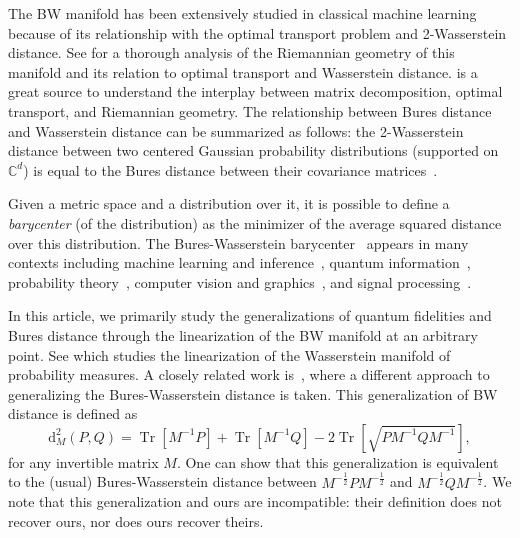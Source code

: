 \documentclass[12pt]{article}
\theoremstyle{definition}
\begin{document}
The BW manifold has been extensively studied in classical machine learning because of its relationship with the optimal transport problem and 2-Wasserstein distance. See \cite{bhatia2019bures} for a thorough analysis of the Riemannian geometry of this manifold and its relation to optimal transport and Wasserstein distance. \cite{modin2016geometry} is a great source to understand the interplay between matrix decomposition, optimal transport, and Riemannian geometry. The relationship between Bures distance and Wasserstein distance can be summarized as follows: the 2-Wasserstein distance between two centered Gaussian probability distributions (supported on $\mathbb C^d$) is equal to the Bures distance between their covariance matrices~\cite{bhatia2019bures}.

Given a metric space and a distribution over it, it is possible to define a \textit{barycenter} (of the distribution) as the minimizer of the average squared distance over this distribution. The Bures-Wasserstein barycenter~\cite{agueh2011barycenters, alvarez2016fixed, bhatia2019bures, chewi2020gradient} appears in many contexts including machine 
learning and inference~\cite{cuturi2014fast, ho2017multilevel, dognin2019wasserstein}, quantum information~\cite{afham2022, brahmachari2023fixed, konig2009operational, Wilde2023estimating}, probability theory~\cite{knott1994generalization, ruschendorf2002n}, computer vision and graphics~\cite{rabin2012wasserstein, solomon2015convolutional}, and signal processing~\cite{elvander2020multi}.



In this article, we primarily study the generalizations of quantum fidelities and Bures distance through the linearization of the BW manifold at an arbitrary point. See \cite{hamm2023manifold, cai2022linearized} which studies the linearization of the Wasserstein manifold of probability measures. A closely related work is~\cite{JawanpuriaGeneralizedBuresDistance}, where a different approach to generalizing the Bures-Wasserstein distance is taken. This generalization of BW distance is defined as 
\begin{equation}
    \mathrm{d}^2_M(P,Q) = \operatorname{Tr}\left[M ^{-1} P\right] + \operatorname{Tr}\left[M ^{-1} Q\right] - 2 \operatorname{Tr} \left[\sqrt{P M ^{-1}  Q M^{-1} }\right],
\end{equation}
for any invertible matrix $M$. One can show that this generalization is equivalent to the (usual) Bures-Wasserstein distance between $M ^{-\frac12} P M^{-\frac12} $ and $ M ^{-\frac12} Q M^{-\frac12} $. We note that this generalization and ours are incompatible: their definition does not recover ours, nor does ours recover theirs.
\end{document}

